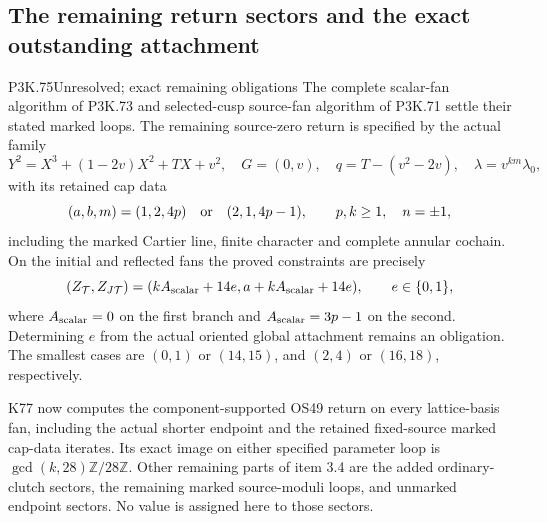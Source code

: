 \subsection{The remaining return sectors and the exact outstanding attachment}
\begin{statement}{P3K.75}{Unresolved; exact remaining obligations}
The complete scalar-fan algorithm of P3K.73 and selected-cusp
source-fan algorithm of P3K.71 settle their stated marked loops.
The remaining source-zero return is specified by the actual family
\[
 Y^2=X^3+(1-2v)X^2+TX+v^2,\quad G=(0,v),\quad
 q=T-(v^2-2v),\quad \lambda=v^{km}\lambda_0,
\]
with its retained cap data
\[
 (a,b,m)=(1,2,4p)\quad\hbox{or}\quad(2,1,4p-1),
 \qquad p,k\ge1,\quad n=\pm1,
\]
including the marked Cartier line, finite character and complete
annular cochain. On the initial and reflected fans the proved
constraints are precisely
\[
 (Z_{\mathcal T},Z_{J\mathcal T})=
 (kA_{\rm scalar}+14e,a+kA_{\rm scalar}+14e),\qquad
 e\in\{0,1\},
\]
where \(A_{\rm scalar}=0\) on the first branch and
\(A_{\rm scalar}=3p-1\) on the second. Determining \(e\)
from the actual oriented global attachment remains an obligation.
The smallest cases are \((0,1)\) or \((14,15)\), and
\((2,4)\) or \((16,18)\), respectively.

K77 now computes the component-supported OS49 return on every
lattice-basis fan, including the actual shorter endpoint and
the retained fixed-source marked cap-data iterates. Its exact
image on either specified parameter loop is
\(\gcd(k,28)\mathbb Z/28\mathbb Z\).
Other remaining parts of item 3.4 are the added ordinary-clutch
sectors, the remaining marked source-moduli loops, and unmarked
endpoint sectors. No value is assigned here to those sectors.
\end{statement}
